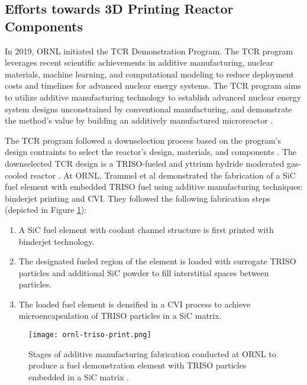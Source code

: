 \subsection{Efforts towards 3D Printing Reactor Components}
In 2019, \gls{ORNL} initiated the \gls{TCR} Demonstration Program.
The \gls{TCR} program leverages recent scientific achievements in additive 
manufacturing, nuclear materials, machine learning, and computational modeling
to reduce deployment costs and timelines for advanced nuclear energy systems. 
The \gls{TCR} program aims to utilize additive manufacturing technology to 
establish advanced nuclear energy system designs unconstrained by conventional 
manufacturing, and demonstrate the method's value by building an additively 
manufactured microreactor \cite{terrani_transformational_2019}. 

The \gls{TCR} program followed a downselection process based on the program's 
design contraints to select the reactor's design, materials, and components
\cite{betzler_transformational_2020}.
The downselected TCR design is a TRISO-fueled and yttrium hydride moderated 
gas-cooled reactor \cite{betzler_transformational_2020}.
At \gls{ORNL}, Trammel et al \cite{trammell_advanced_2019} demonstrated 
the fabrication of a SiC fuel element with embedded \gls{TRISO} fuel using 
additive manufacturing techniques: binderjet printing and \gls{CVI}. 
They followed the following fabrication steps (depicted in Figure 
\ref{fig:ornl-triso-print}): 
\begin{enumerate}
    \item A SiC fuel element with coolant channel structure is first printed with 
    binderjet technology. 
    \item The designated fueled region of the element is loaded with surrogate 
    \gls{TRISO} particles and additional SiC powder to fill interstitial spaces
    between particles. 
    \item The loaded fuel element is densified in a \gls{CVI} process to achieve 
    microencapsulation of \gls{TRISO} particles in a SiC matrix. 
\end{enumerate}
\begin{figure}[]
    \centering
    \texttt{[image: ornl-triso-print.png]} 
    \caption{Stages of additive manufacturing fabrication conducted at \acrlong{ORNL} to 
    produce a fuel demonstration element with \gls{TRISO} particles embedded in 
    a SiC matrix \cite{trammell_advanced_2019}.}
    \label{fig:ornl-triso-print}
\end{figure}
